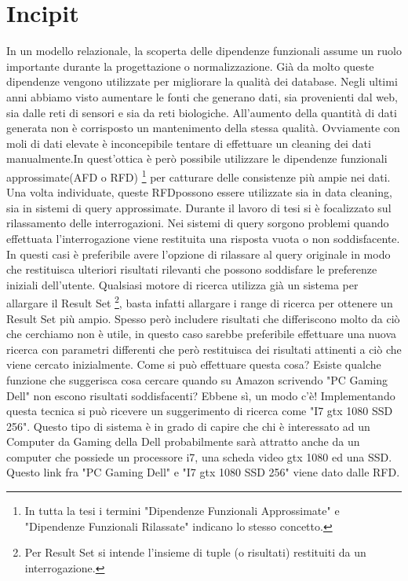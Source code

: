 \section{Incipit}

In un modello relazionale, la scoperta delle dipendenze funzionali assume un ruolo importante durante la progettazione o normalizzazione. Già da molto queste dipendenze vengono utilizzate per migliorare la qualità dei database.
Negli ultimi anni abbiamo visto aumentare le fonti che generano dati, sia provenienti dal web, sia dalle reti di sensori e sia da reti biologiche. All’aumento della quantità di dati generata non è corrisposto un mantenimento della stessa qualità. Ovviamente con moli di dati elevate è inconcepibile tentare di effettuare un cleaning dei dati manualmente.In quest’ottica è però possibile utilizzare le dipendenze funzionali approssimate(AFD o RFD) \footnote{In tutta la tesi i termini "Dipendenze Funzionali Approssimate" e "Dipendenze Funzionali Rilassate" indicano lo stesso concetto.} per catturare delle consistenze più ampie nei dati.
Una volta individuate, queste RFDpossono essere utilizzate sia in data cleaning, sia in sistemi di query approssimate. Durante il lavoro di tesi si è focalizzato sul rilassamento delle interrogazioni. Nei sistemi di query sorgono problemi quando effettuata l'interrogazione viene restituita una risposta vuota o non soddisfacente. In questi casi è preferibile avere l'opzione di rilassare al query originale in modo che restituisca ulteriori risultati rilevanti che possono soddisfare le preferenze iniziali dell'utente. Qualsiasi motore di ricerca utilizza già un sistema per allargare il Result Set \footnote{Per Result Set si intende l'insieme di tuple (o risultati) restituiti da un interrogazione.}, basta infatti allargare i range di ricerca per ottenere un Result Set più ampio. Spesso però includere risultati che differiscono molto da ciò che cerchiamo non è utile, in questo caso sarebbe preferibile effettuare una nuova ricerca con parametri differenti che però restituisca dei risultati attinenti a ciò che viene cercato inizialmente. Come si può effettuare questa cosa? Esiste qualche funzione che suggerisca cosa cercare quando su Amazon scrivendo "PC Gaming Dell" non escono risultati soddisfacenti? Ebbene sì, un modo c'è! Implementando questa tecnica si può ricevere un suggerimento di ricerca come "I7 gtx 1080 SSD 256". Questo tipo di sistema è in grado di capire che chi è interessato ad un Computer da Gaming della Dell probabilmente sarà attratto anche da un computer che possiede un processore i7, una scheda video gtx 1080 ed una SSD.
Questo link fra "PC Gaming Dell" e "I7 gtx 1080 SSD 256" viene dato dalle RFD.


